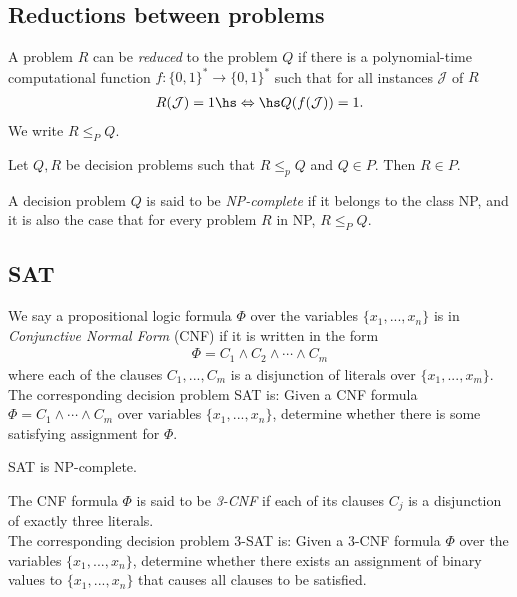 \documentclass{article}
\begin{document}
\subsection{Reductions between problems}

\begin{definition}
	A problem $R$ can be \emph{reduced} to the problem $Q$ if there
	is a polynomial-time computational function $f:\{0,1\}^*\to\{0,1\}^*$
	such that for all instances $\mathcal{J}$ of $R$
	\begin{align*}
		R(\mathcal{J})=1 \hs\Leftrightarrow\hs Q(f(\mathcal{J}))=1.
	\end{align*}
	We write $R\leq_P Q$.
\end{definition}

\begin{theorem}
	Let $Q,R$ be decision problems such that $R\leq_p Q$ and
	$Q\in P$. Then $R\in P$.
\end{theorem}

\begin{definition}
	A decision problem $Q$ is said to be \emph{NP-complete} if it
	belongs to the class NP, and it is also the case that for every
	problem $R$ in NP, $R\leq_P Q$.
\end{definition}

\subsection{SAT}

\begin{definition}
	We say a propositional logic formula $\Phi$ over the variables
	$\{x_1, ..., x_n\}$ is in \emph{Conjunctive Normal Form} (CNF)
	if it is written in the form
	\begin{align*}
		\Phi = C_1 \wedge C_2 \wedge \cdots \wedge C_m
	\end{align*}
	where each of the clauses $C_1, ..., C_m$ is a disjunction
	of literals over $\{x_1,...,x_m\}$.\\
	The corresponding decision problem SAT is:
	Given a CNF formula $\Phi=C_1\wedge\cdots\wedge C_m$ over
	variables $\{x_1,...,x_n\}$, determine whether there is some
	satisfying assignment for $\Phi$.	
\end{definition}

\begin{theorem}
	SAT is NP-complete.	
\end{theorem}

\begin{definition}
	The CNF formula $\Phi$ is said to be \emph{3-CNF} if each of its clauses
	$C_j$ is a disjunction of exactly three literals.\\
	The corresponding decision problem 3-SAT is:
	Given a 3-CNF formula $\Phi$ over the variables $\{x_1,...,x_n\}$,
	determine whether there exists an assignment of binary values to
	$\{x_1,...,x_n\}$ that causes all clauses to be satisfied.
\end{definition}
\end{document}
